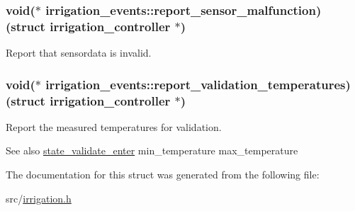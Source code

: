 \subsubsection[{report\+\_\+sensor\+\_\+malfunction}]{\setlength{\rightskip}{0pt plus 5cm}void($\ast$ irrigation\+\_\+events\+::report\+\_\+sensor\+\_\+malfunction) (struct {\bf irrigation\+\_\+controller} $\ast$)}\label{structirrigation__events_abafd6872889e6e54648653f690e61ec6}


Report that sensordata is invalid. 

\hypertarget{structirrigation__events_acc5d9d31cce6888cab54d32463470f07}{}
\subsubsection[{report\+\_\+validation\+\_\+temperatures}]{\setlength{\rightskip}{0pt plus 5cm}void($\ast$ irrigation\+\_\+events\+::report\+\_\+validation\+\_\+temperatures) (struct {\bf irrigation\+\_\+controller} $\ast$)}\label{structirrigation__events_acc5d9d31cce6888cab54d32463470f07}


Report the measured temperatures for validation. 

\begin{DoxySeeAlso}{See also}
\hyperlink{group__state__validate_gac0d41d4685bd461b3a613f6320405b79}{state\+\_\+validate\+\_\+enter} min\+\_\+temperature max\+\_\+temperature 
\end{DoxySeeAlso}


The documentation for this struct was generated from the following file\+:\begin{DoxyCompactItemize}
\item 
src/\hyperlink{irrigation_8h}{irrigation.\+h}\end{DoxyCompactItemize}
